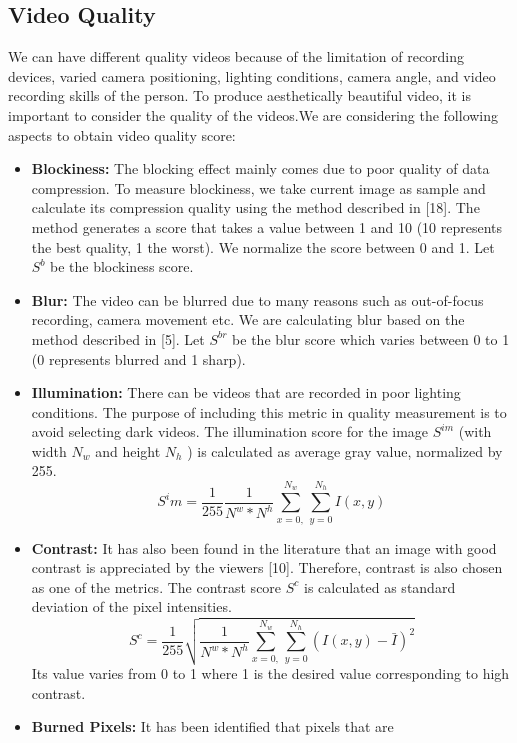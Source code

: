 \documentclass{sig-alternate-05-2015}
\begin{document}
\subsection{Video Quality}
We can have different quality videos because of the limitation of
recording devices, varied camera positioning, lighting conditions,
camera angle, and video recording skills of the person. To produce
aesthetically beautiful video, it is important to consider the quality
of the videos.We are considering the following aspects to obtain
video quality score:
 \begin{itemize} 
    \item \textbf{Blockiness: } The blocking effect mainly comes due to poor
quality of data compression. To measure blockiness, we take
current image as sample and calculate its compression quality using the method described in [18]. The method generates
a score that takes a value between 1 and 10 (10 represents the
best quality, 1 the worst). We normalize the score between 0
and 1. Let $S^b$ be the blockiness score.
    \item \textbf{Blur: } The video can be blurred due to many reasons such as
out-of-focus recording, camera movement etc. We are calculating blur based on the method described in [5]. Let $S^{br}$
be the blur score which varies between 0 to 1 (0 represents
blurred and 1 sharp).
    \item \textbf{Illumination: } There can be videos that are recorded in poor
lighting conditions. The purpose of including this metric in
quality measurement is to avoid selecting dark videos. The
illumination score for the image $S^{im}$ (with width $N_w$ and
height $N_h$ ) is calculated as average gray value, normalized
by 255.
\begin{equation}
    S^im = \dfrac{1}{255}\dfrac{1}{N^w*N^h}\sum_{x=0,}^{N_w}\sum_{y=0}^{N_h}I(x,y)
\end{equation}
    \item \textbf{Contrast: } It has also been found in the literature that an image with good contrast is appreciated by the viewers [10].
Therefore, contrast is also chosen as one of the metrics. The
contrast score $S^c$ is calculated as standard deviation of the
pixel intensities.
\begin{equation}
    S^c = \dfrac{1}{255}\sqrt{\dfrac{1}{N^w*N^h}\sum_{x=0,}^{N_w}\sum_{y=0}^{N_h}(I(x,y)-\bar{I})^2}
\end{equation}
Its value varies from 0 to 1 where 1 is the desired value corresponding to high contrast.
    \item \textbf{Burned Pixels:} It has been identified that pixels that are

\end{itemize}
\end{document}
